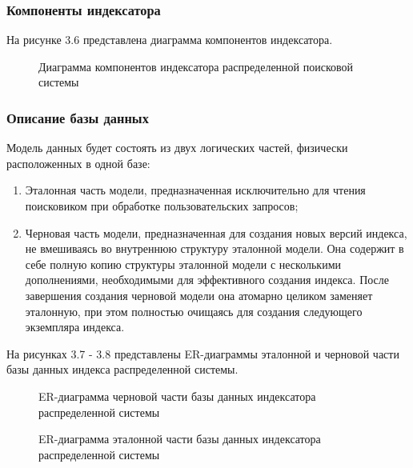 \subsubsection{Компоненты индексатора}

На рисунке 3.6 представлена диаграмма компонентов индексатора.

\begin{figure}
\caption{Диаграмма компонентов индексатора распределенной поисковой системы}
\label{indexer/diagram_components:image}
\end{figure}

\subsubsection{Описание базы данных}

Модель данных будет состоять из двух логических частей, физически расположенных в одной базе:
\begin{enumerate}
\item Эталонная часть модели, предназначенная исключительно для чтения поисковиком при обработке пользовательских запросов;
\item Черновая часть модели, предназначенная для создания новых версий индекса, не вмешиваясь во внутреннюю структуру эталонной модели. Она содержит в себе полную копию структуры эталонной модели с несколькими дополнениями, необходимыми для эффективного создания индекса. После завершения создания черновой модели она атомарно целиком заменяет эталонную, при этом полностью очищаясь для создания следующего экземпляра индекса.
\end{enumerate}

На рисунках 3.7 - 3.8 представлены ER-диаграммы эталонной и черновой части базы данных индекса распределенной системы.

\begin{figure}
\caption{ER-диаграмма черновой части базы данных индексатора распределенной системы}
\label{indexer/indexer_sec_db:image}
\end{figure}

\begin{figure}
\caption{ER-диаграмма эталонной части базы данных индексатора распределенной системы}
\label{indexer/indexer_db:image}
\end{figure}

